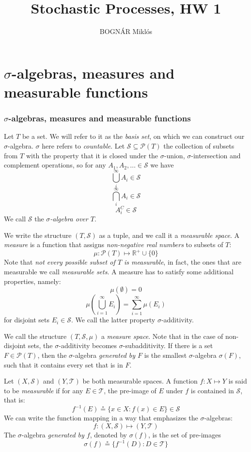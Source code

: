 \documentclass[xcolor=dvipsnames]{beamer}
\author{BOGNÁR Miklós}
\title{Stochastic Processes, HW 1}
\begin{document}
\maketitle
\section{$\sigma$-algebras, measures and measurable functions}
\begin{frame}
\frametitle{$\sigma$-algebras, measures and measurable functions}
Let $T$ be a set. We will refer to it as the \emph{basis set}, on which we can construct our $\sigma$-algebra. $\sigma$ here refers to \emph{countable}. Let $\mathcal{S} \subseteq \mathcal{P}(T)$ the collection of subsets from $T$ with the property that it is closed under the $\sigma$-union, $\sigma$-intersection and complement operations, so for any $A_1, A_2, \dots \in \mathcal{S}$ we have
\[
	\bigcup_i^{\infty}{A_i} \in \mathcal{S}
\]
\[
	\bigcap_i^{\infty}{A_i} \in \mathcal{S}
\]
\[
	A_i^C \in \mathcal{S}
\]
We call $\mathcal{S}$ the \emph{$\sigma$-algebra over $T$}.
\end{frame}
\begin{frame}
We write the structure $(T, \mathcal{S})$ as a tuple, and we call it a \emph{measurable space}. A \emph{measure} is a function that assigns \emph{non-negative real numbers} to subsets of $T$:
\[
	\mu: \mathcal{P}(T) \mapsto \mathbb{R}^{+} \cup \{0\} 
\]
Note that \emph{not every possible subset of $T$ is measurable}, in fact, the ones that are measurable we call \emph{measurable sets}. A measure has to satisfy some additional properties, namely:
\[
	\mu(\emptyset) = 0
\]
\[
	\mu(\bigcup_{i=1}^{\infty}{E_i}) = \sum_{i=1}^{\infty}{\mu(E_i)}
\]
for disjoint sets $E_i \in \mathcal{S}$. We call the latter property $\sigma$-additivity.
\end{frame}
\begin{frame}
We call the structure $(T, \mathcal{S}, \mu)$ a \emph{measure space}. Note that in the case of non-disjoint sets, the $\sigma$-additivity becomes $\sigma$-subadditivity. If there is a set $F \in \mathcal{P}(T)$, then the $\sigma$-algebra \emph{generated by $F$} is the smallest $\sigma$-algebra $\sigma(F)$, such that it contains every set that is in $F$.
\end{frame}
\begin{frame}
Let $(X, \mathcal{S})$ and $(Y, \mathcal{T})$ be both measurable spaces. A function $f : X \mapsto Y$ is said to be \emph{measurable} if for any $E \in \mathcal{T}$, the pre-image of $E$ under $f$ is contained in $\mathcal{S}$, that is:
\[
	f^{-1}(E) \circeq \{x \in X : f(x) \in E\} \in \mathcal{S}
\]
We can write the function mapping in a way that emphasizes the $\sigma$-algebras:
\[
	f : (X, \mathcal{S}) \mapsto (Y, \mathcal{T})
\]
The $\sigma$-algebra \emph{generated by $f$}, denoted by $\sigma(f)$, is the set of pre-images
\[
	\sigma(f) \circeq \{f^{-1}(D) : D \in \mathcal{T}\}
\]
\end{frame}
\end{document}

